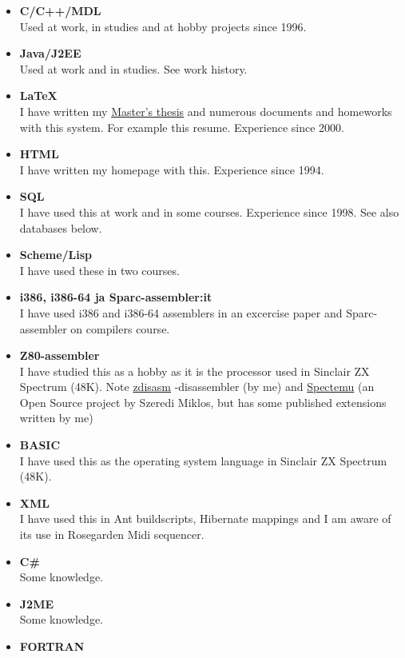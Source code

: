 \documentclass[a4paper,12pt]{article}
\begin{document}
\begin{itemize}
\item
{\bf C/C++/MDL} \\
Used at work, in studies and at hobby projects since 1996.
\item
{\bf Java/J2EE} \\
Used at work and in studies. See work history.
\item
{\bf LaTeX} \\
I have written my \href{http://math.tkk.fi/~mnummeli/tutkimus/diplomityo.pdf}
{Master's thesis} and numerous documents and homeworks with
this system. For example this resume. Experience since 2000.
\item
{\bf HTML} \\
I have written my homepage with this. Experience since 1994.
\item
{\bf SQL} \\
I have used this at work and in some courses. Experience since 1998.
See also databases below.
\item
{\bf Scheme/Lisp} \\
I have used these in two courses.
\item
{\bf i386, i386-64 ja Sparc-assembler:it} \\
I have used i386 and i386-64 assemblers in an excercise paper and
Sparc-assembler on compilers course.
\item
{\bf Z80-assembler} \\
I have studied this as a hobby as it is the processor used in
Sinclair ZX Spectrum (48K). Note 
\href{http://math.tkk.fi/~mnummeli/tite/spectrum/zdisasm.en.html}{zdisasm}
-disassembler (by me) and 
\href{http://www.inf.bme.hu/~mszeredi/spectemu/spectemu.html#pre}{Spectemu}
(an Open Source project by Szeredi Miklos,
but has some published extensions written by me)
\item
{\bf BASIC} \\
I have used this as the operating system language in Sinclair ZX Spectrum (48K).
\item
{\bf XML} \\
I have used this in Ant buildscripts, Hibernate mappings and I am aware of its
use in Rosegarden Midi sequencer.
\item
{\bf C\#} \\
Some knowledge.
\item
{\bf J2ME} \\
Some knowledge.
\item
{\bf FORTRAN} \\

\end{itemize}
\end{document}
